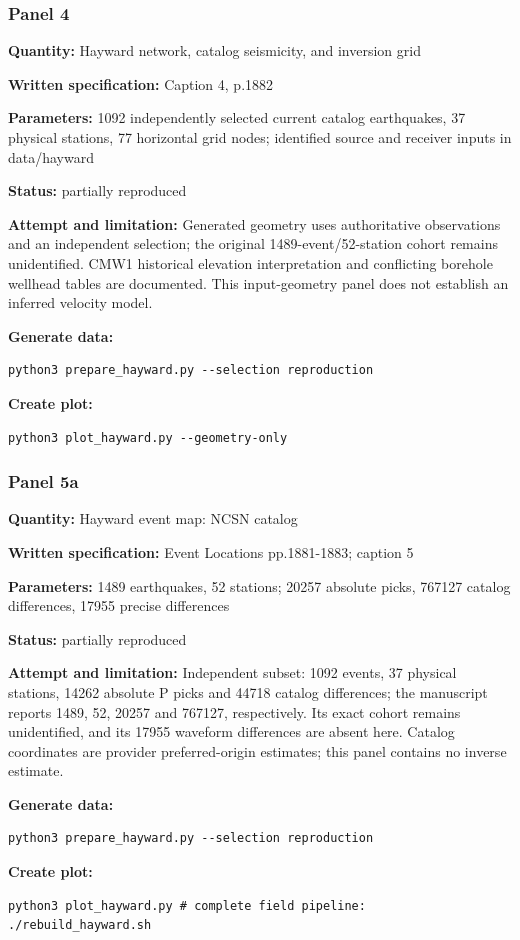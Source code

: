 \subsubsection*{Panel 4}
\noindent\textbf{Quantity:} Hayward network, catalog seismicity, and inversion grid\par
\noindent\textbf{Written specification:} Caption 4, p.1882\par
\noindent\textbf{Parameters:} 1092 independently selected current catalog earthquakes, 37 physical stations, 77 horizontal grid nodes; identified source and receiver inputs in data/hayward\par
\noindent\textbf{Status:} partially reproduced\par
\noindent\textbf{Attempt and limitation:} Generated geometry uses authoritative observations and an independent selection; the original 1489-event/52-station cohort remains unidentified. CMW1 historical elevation interpretation and conflicting borehole wellhead tables are documented. This input-geometry panel does not establish an inferred velocity model.\par
\noindent\textbf{Generate data:}
\begin{lstlisting}
python3 prepare_hayward.py --selection reproduction
\end{lstlisting}
\noindent\textbf{Create plot:}
\begin{lstlisting}
python3 plot_hayward.py --geometry-only
\end{lstlisting}
\subsubsection*{Panel 5a}
\noindent\textbf{Quantity:} Hayward event map: NCSN catalog\par
\noindent\textbf{Written specification:} Event Locations pp.1881-1883; caption 5\par
\noindent\textbf{Parameters:} 1489 earthquakes, 52 stations; 20257 absolute picks, 767127 catalog differences, 17955 precise differences\par
\noindent\textbf{Status:} partially reproduced\par
\noindent\textbf{Attempt and limitation:} Independent subset: 1092 events, 37 physical stations, 14262 absolute P picks and 44718 catalog differences; the manuscript reports 1489, 52, 20257 and 767127, respectively. Its exact cohort remains unidentified, and its 17955 waveform differences are absent here. Catalog coordinates are provider preferred-origin estimates; this panel contains no inverse estimate.\par
\noindent\textbf{Generate data:}
\begin{lstlisting}
python3 prepare_hayward.py --selection reproduction
\end{lstlisting}
\noindent\textbf{Create plot:}
\begin{lstlisting}
python3 plot_hayward.py # complete field pipeline: ./rebuild_hayward.sh
\end{lstlisting}
